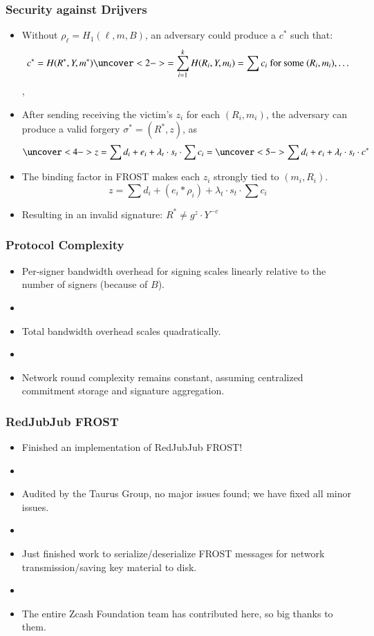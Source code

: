 \documentclass[hyperref={pdfpagelabels=true},table,dvipsnames,14pt,aspectratio=169]{beamer}
\begin{document}
\begin{frame}
  \frametitle{Security against Drijvers}
  \small

  \begin{itemize}
    \item<1->[] Without $\rho_\ell = H_1(\ell, m, B) $,
  an adversary could produce a $c^*$ such that:
      \[ c^*= H(R^*, Y, m^*) \uncover<2->{ = \sum_{i=1}^{k} H(R_i, Y, m_i)  =
      \sum c_i  \text{ for some } (R_i, m_i), \dots } \],
    \item<3->[] After sending receiving the victim's $z_i$ for each $(R_i, m_i)$, the
  adversary can produce a valid forgery $\sigma^*=(R^*, z)$, as
      \[ \uncover<4-> {z = \sum d_i + e_i + \lambda_t \cdot s_t \cdot \sum c_i} = \uncover<5->
      { \sum d_i + e_i + \lambda_t \cdot s_t \cdot c^*} \]
    \item<6->[] The binding factor in FROST makes each $z_i$ strongly tied to
      $(m_i, R_i)$.
      \[ z = \sum d_i + (e_i * \rho_i) + \lambda_t \cdot s_t \cdot \sum c_i  \]
    \item<7->[] Resulting in an invalid signature: $R^* \neq g^z \cdot Y^{-c}$
  \end{itemize}
\end{frame}

\begin{frame}
  \frametitle{Protocol Complexity}

  \begin{itemize}
    \item<1-> Per-signer bandwidth overhead for signing scales linearly
      relative to the number of signers (because of $B$).
    \item[]~
    \item<2-> Total bandwidth overhead scales quadratically.
    \item[]~
    \item<3-> Network round complexity remains constant, assuming centralized
      commitment storage and signature aggregation.
  \end{itemize}
\end{frame}


\begin{frame}
  \frametitle{RedJubJub FROST}

  \begin{itemize}
    \item<1-> Finished an implementation of RedJubJub FROST!
    \item[]
    \item<2-> Audited by the Taurus Group, no major issues found; we have fixed
      all minor issues.
    \item[]
    \item<3-> Just finished work to serialize/deserialize FROST messages for
      network transmission/saving key material to disk.
    \item[]
    \item<4-> The entire Zcash Foundation team has contributed here, so big thanks to them.
  \end{itemize}
\end{frame}
\end{document}
